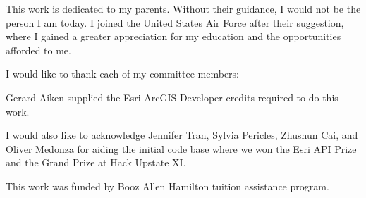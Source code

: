 \begin{acknowledgments}
This work is dedicated to my parents. Without their guidance, I would not be the person I am today. I joined the United States Air Force after their suggestion, where I gained a greater appreciation for my education and the opportunities afforded to me.

I would like to thank each of my committee members: 

Gerard Aiken supplied the Esri ArcGIS Developer credits required to do this work.

I would also like to acknowledge Jennifer Tran, Sylvia Pericles, Zhushun Cai, and Oliver Medonza for aiding the initial code base where we won the Esri API Prize and the Grand Prize at Hack Upstate XI.

This work was funded by Booz Allen Hamilton tuition assistance program.

\end{acknowledgments}

